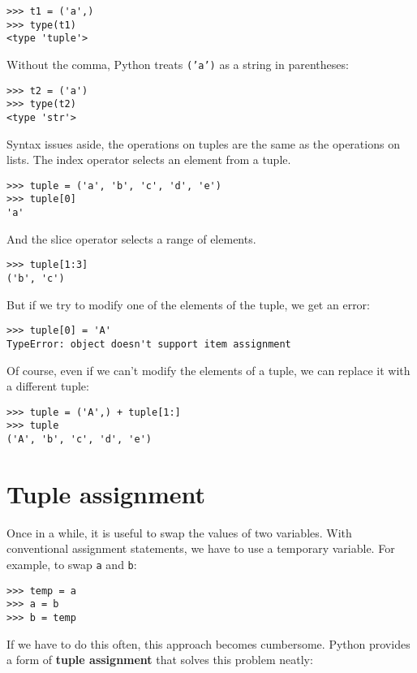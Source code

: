 \beforeverb
\begin{verbatim}
>>> t1 = ('a',)
>>> type(t1)
<type 'tuple'>
\end{verbatim}
\afterverb
%
Without the comma, Python treats {\tt ('a')} as a string in
parentheses:

\beforeverb
\begin{verbatim}
>>> t2 = ('a')
>>> type(t2)
<type 'str'>
\end{verbatim}
\afterverb
%
Syntax issues aside, the operations on tuples are the same as the
operations on lists.  The index operator selects an element from
a tuple.

\beforeverb
\begin{verbatim}
>>> tuple = ('a', 'b', 'c', 'd', 'e')
>>> tuple[0]
'a'
\end{verbatim}
\afterverb
%
And the slice operator selects a range of elements.

\beforeverb
\begin{verbatim}
>>> tuple[1:3]
('b', 'c')
\end{verbatim}
\afterverb
%
But if we try to modify one of the elements of the tuple, we get
an error:


\beforeverb
\begin{verbatim}
>>> tuple[0] = 'A'
TypeError: object doesn't support item assignment
\end{verbatim}
\afterverb
%
Of course, even if we can't modify the elements of a tuple, we can
replace it with a different tuple:

\beforeverb
\begin{verbatim}
>>> tuple = ('A',) + tuple[1:]
>>> tuple
('A', 'b', 'c', 'd', 'e')
\end{verbatim}
\afterverb
%

\section{Tuple assignment}
\label{tuple assignment}

Once in a while, it is useful to swap the values of two variables.
With conventional assignment statements, we have to use a temporary
variable.  For example, to swap {\tt a} and {\tt b}:

\beforeverb
\begin{verbatim}
>>> temp = a
>>> a = b
>>> b = temp
\end{verbatim}
\afterverb
%
If we have to do this often, this approach becomes cumbersome.  Python
provides a form of {\bf tuple assignment} that solves this problem neatly:

